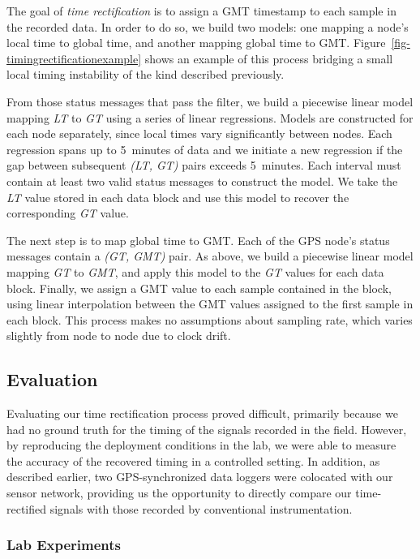 The goal of {\em time rectification} is to assign a GMT timestamp to each
sample in the recorded data. In order to do so, we build two models: one
mapping a node's local time to global time, and another mapping global time
to GMT. Figure~\ref{fig-timingrectificationexample} shows an example of this
process bridging a small local timing instability of the kind described
previously.

From those status messages that pass the filter, we build a piecewise linear
model mapping {\em LT} to {\em GT} using a series of linear regressions.
Models are constructed for each node separately, since local times vary
significantly between nodes.  Each regression spans up to 5~minutes of data
and we initiate a new regression if the gap between subsequent {\em (LT, GT)}
pairs exceeds 5~minutes.  Each interval must contain at least two valid
status messages to construct the model.  We take the {\em LT} value stored in
each data block and use this model to recover the corresponding {\em GT}
value.

The next step is to map global time to GMT. Each of the GPS node's status
messages contain a {\em (GT, GMT)} pair. As above, we build a piecewise
linear model mapping {\em GT} to {\em GMT}, and apply this model to the {\em
GT} values for each data block. Finally, we assign a GMT value to each sample
contained in the block, using linear interpolation between the GMT values
assigned to the first sample in each block.  This process makes no
assumptions about sampling rate, which varies slightly from node to node due
to clock drift.

\subsection{Evaluation}

Evaluating our time rectification process proved difficult, primarily because
we had no ground truth for the timing of the signals recorded in the field.
However, by reproducing the deployment conditions in the lab, we were able to
measure the accuracy of the recovered timing in a controlled setting.  In
addition, as described earlier, two GPS-synchronized data loggers were
colocated with our sensor network, providing us the opportunity to directly
compare our time-rectified signals with those recorded by conventional
instrumentation.

\subsubsection{Lab Experiments}

